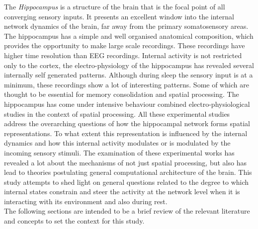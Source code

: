 The \emph{Hippocampus} is a structure of the brain that is the focal point of all converging sensory inputs. It presents an excellent window into the internal network dynamics of the brain, far away from the primary somatosensory areas. The hippocampus has a simple and well organised anatomical composition, which provides the opportunity to make large scale recordings. These recordings have higher time resolution than EEG recordings. Internal activity is not restricted only to the cortex, the electro-physiology of the hippocampus has revealed several internally self generated patterns. Although during sleep the sensory input is at a minimum, these recordings show a lot of interesting patterns. Some of which are thought to be essential for memory consolidation and spatial processing.  
The hippocampus has come under intensive behaviour combined electro-physiological studies in the context of spatial processing. All these experimental studies address the overarching questions of how the hippocampal network forms spatial representations. To what extent this representation is influenced by the internal dynamics and how this internal activity modulates or is modulated by the incoming sensory stimuli. The examination of these experimental works has revealed a lot about the mechanisms of not just spatial processing, but also has lead to theories postulating general computational architecture of the brain. This study attempts to shed light on general questions related to the degree to which internal states constrain and steer the activity at the network level when it is interacting with its environment and also during rest. \\
The following sections are intended to be a brief review of the relevant literature and concepts to set the context for this study.





%
%
%
%

